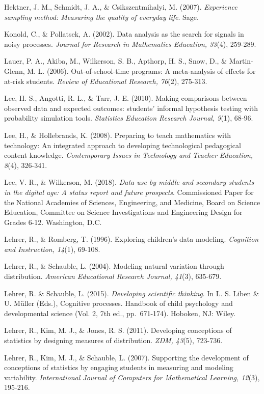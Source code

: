 \documentclass[]{book}
\theoremstyle{definition}
\theoremstyle{definition}
\theoremstyle{definition}
\theoremstyle{remark}
\begin{document}
Hektner, J. M., Schmidt, J. A., \& Csikszentmihalyi, M. (2007).
\emph{Experience sampling method: Measuring the quality of everyday
life}. Sage.

Konold, C., \& Pollatsek, A. (2002). Data analysis as the search for
signals in noisy processes. \emph{Journal for Research in Mathematics
Education, 33}(4), 259-289.

Lauer, P. A., Akiba, M., Wilkerson, S. B., Apthorp, H. S., Snow, D., \&
Martin-Glenn, M. L. (2006). Out-of-school-time programs: A meta-analysis
of effects for at-risk students. \emph{Review of Educational Research,
76}(2), 275-313.

Lee, H. S., Angotti, R. L., \& Tarr, J. E. (2010). Making comparisons
between observed data and expected outcomes: students' informal
hypothesis testing with probability simulation tools. \emph{Statistics
Education Research Journal, 9}(1), 68-96.

Lee, H., \& Hollebrands, K. (2008). Preparing to teach mathematics with
technology: An integrated approach to developing technological
pedagogical content knowledge. \emph{Contemporary Issues in Technology
and Teacher Education, 8}(4), 326-341.

Lee, V. R., \& Wilkerson, M. (2018). \emph{Data use by middle and
secondary students in the digital age: A status report and future
prospects}. Commissioned Paper for the National Academies of Sciences,
Engineering, and Medicine, Board on Science Education, Committee on
Science Investigations and Engineering Design for Grades 6-12.
Washington, D.C.

Lehrer, R., \& Romberg, T. (1996). Exploring children's data modeling.
\emph{Cognition and Instruction, 14}(1), 69-108.

Lehrer, R., \& Schauble, L. (2004). Modeling natural variation through
distribution. \emph{American Educational Research Journal, 41}(3),
635-679.

Lehrer, R. \& Schauble, L. (2015). \emph{Developing scientific
thinking}. In L. S. Liben \& U. Müller (Eds.), Cognitive processes.
Handbook of child psychology and developmental science (Vol. 2, 7th ed.,
pp.~671-174). Hoboken, NJ: Wiley.

Lehrer, R., Kim, M. J., \& Jones, R. S. (2011). Developing conceptions
of statistics by designing measures of distribution. \emph{ZDM, 43}(5),
723-736.

Lehrer, R., Kim, M. J., \& Schauble, L. (2007). Supporting the
development of conceptions of statistics by engaging students in
measuring and modeling variability. \emph{International Journal of
Computers for Mathematical Learning, 12}(3), 195-216.
\end{document}
